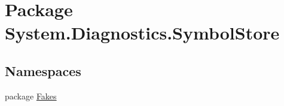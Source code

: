 \hypertarget{namespace_system_1_1_diagnostics_1_1_symbol_store}{\section{Package System.\-Diagnostics.\-Symbol\-Store}
\label{namespace_system_1_1_diagnostics_1_1_symbol_store}
}
\subsection*{Namespaces}
\begin{DoxyCompactItemize}
\item 
package \hyperlink{namespace_system_1_1_diagnostics_1_1_symbol_store_1_1_fakes}{Fakes}
\end{DoxyCompactItemize}
